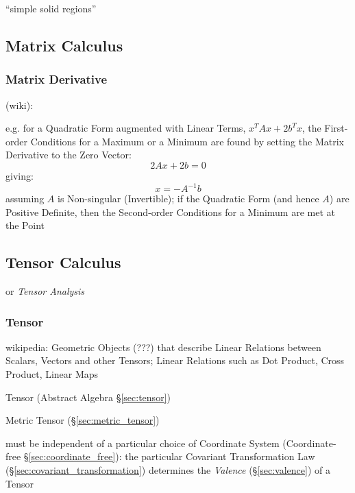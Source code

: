 ``simple solid regions''



\subsection{Matrix Calculus}\label{sec:matrix_calculus}

\subsubsection{Matrix Derivative}\label{sec:matrix_derivative}

(wiki):

e.g. for a Quadratic Form augmented with Linear Terms, $x^TAx + 2b^Tx$, the
First-order Conditions for a Maximum or a Minimum are found by setting the
Matrix Derivative to the Zero Vector:
\[
  2Ax + 2b = 0
\]
giving:
\[
  x = -A^{-1}b
\]
assuming $A$ is Non-singular (Invertible); if the Quadratic Form (and hence
$A$) are Positive Definite, then the Second-order Conditions for a
Minimum are met at the Point



\subsection{Tensor Calculus}\label{sec:tensor_calculus}

or \emph{Tensor Analysis}



\subsubsection{Tensor}\label{sec:linear_tensor}

wikipedia: Geometric Objects (???) that describe Linear Relations
between Scalars, Vectors and other Tensors; Linear Relations such as
Dot Product, Cross Product, Linear Maps


\fist Tensor (Abstract Algebra \S\ref{sec:tensor})

\fist Metric Tensor (\S\ref{sec:metric_tensor})

must be independent of a particular choice of Coordinate System
(Coordinate-free \S\ref{sec:coordinate_free}): the particular Covariant
Transformation Law (\S\ref{sec:covariant_transformation}) determines
the \emph{Valence} (\S\ref{sec:valence}) of a Tensor

